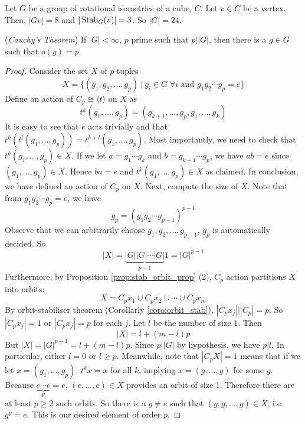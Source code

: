 \documentclass[10pt, a4paper, twoside]{report}
\begin{document}
\begin{example}
    Let \(G\) be a group of rotational isometries of a cube, \(C\). Let \(v\in C\) be a vertex. Then, \(|Gv|=8\) and \(|\operatorname{Stab}_G(v)|=3\). So \(|G|=24\).
\end{example}
\begin{theorem}
    (\emph{Cauchy's Theorem}) If \(|G|<\infty\), \(p\) prime such that \(p\big||G|\), then there is a \(g\in G\) such that \(o(g)=p\).
\end{theorem}
\begin{proof}
    Consider the set \(X\) of \(p\)-tuples 
    \[X=\{(g_1,g_2,\ldots,g_p)\:|\:g_i\in G\;\forall i\text{  and  }g_1g_2\cdots g_p=e\}\]
    Define an action of \(C_p\cong\langle t\rangle\) on \(X\) as 
    \[t^k(g_1,\ldots,g_p)=(g_{k+1},\ldots,g_p,g_1,\ldots,g_k)\]
    It is easy to see that \(e\) acts trivially and that \(t^k(t^l(g_1,\ldots,g_p))=t^{k+l}(g_1,\ldots,g_p)\). Most importantly, we need to check that \(t^k(g_1,\ldots,g_p)\in X\). If we let \(a=g_1\cdots g_k\) and \(b=g_{k+1}\cdots g_p\), we have \(ab=e\) since \((g_1,\ldots,g_p)\in X\). Hence \(ba=e\) and \(t^k(g_1,\ldots,g_p)\in X\) as claimed. In conclusion, we have defined an action of \(C_p\) on \(X\). Next, compute the size of \(X\). Note that from \(g_1g_2\cdots g_p=e\), we have 
    \[g_p=(g_1g_2\cdots g_{p-1})^{p-1}\]
    Observe that we can arbitrarily choose \(g_1,g_2,\ldots,g_{p-1}\), \(g_p\) is automatically decided. So
    \[|X|=\underbrace{|G||G|\cdots|G|}_{p-1}1=|G|^{p-1}\]
    Furthermore, by Proposition \ref{prop:stab_orbit_prop} (2), \(C_p\) action partitions \(X\) into orbits:
    \[X=C_px_1\cup C_px_2\cup\cdots\cup C_px_m\]
    By orbit-stabiliser theorem (Corollarly \ref{coro:orbit_stab}), \(|C_px_j|\big||C_p|=p\). So \(|C_px_j|=1\) or \(|C_px_j|=p\) for each \(j\). Let \(l\) be the number of size \(1\). Then 
    \[|X|=l+(m-l)p\]
    But \(|X|=|G|^{p-1}=l+(m-l)p\). Since \(p\big||G|\) by hypothesis, we have \(p|l\). In particular, either \(l=0\) or \(l\geq p\). Meanwhile, note that \(|C_pX|=1\) means that if we let \(x=(g_1,\ldots,g_p)\), \(t^kx=x\) for all \(k\), implying \(x=(g,\ldots,g)\) for some \(g\). Because \(\underbrace{e\cdots e}_{p}=e\), \((e,\ldots,e)\in X\) provides an orbit of size 1. Therefore there are at least \(p\geq 2\) such orbits. So there is a \(g\neq e\) such that \((g,g,\ldots,g)\in X\), i.e. \(g^p=e\). This is our desired element of order \(p\).
\end{proof}
\end{document}
